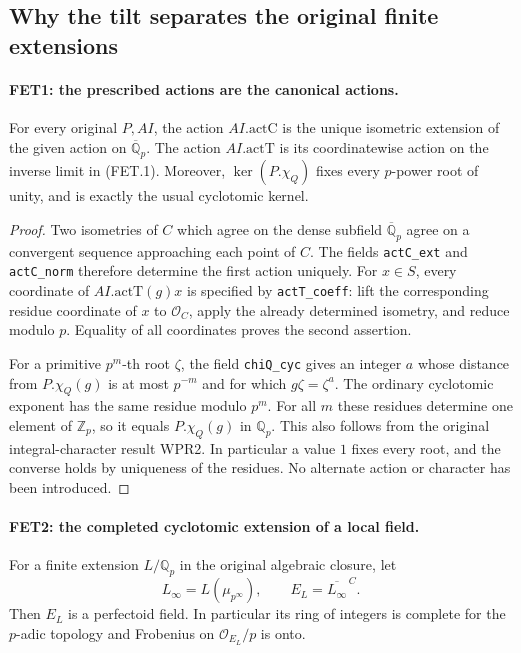 \subsection{Why the tilt separates the original finite extensions}

\paragraph{FET1: the prescribed actions are the canonical actions.}
\label{claim:FET1}
For every original $P,AI$, the action $AI.\mathrm{actC}$ is the
unique isometric extension of the given action on
$\overline{\mathbb Q}_p$. The action $AI.\mathrm{actT}$ is its
coordinatewise action on the inverse limit in (FET.1). Moreover,
$\ker(P.\chi_Q)$ fixes every $p$-power root of unity, and is exactly
the usual cyclotomic kernel.

\begin{proof}
Two isometries of $C$ which agree on the dense subfield
$\overline{\mathbb Q}_p$ agree on a convergent sequence approaching
each point of $C$. The fields \texttt{actC\_ext} and
\texttt{actC\_norm} therefore determine the first action uniquely.
For $x\in S$, every coordinate of $AI.\mathrm{actT}(g)x$ is
specified by \texttt{actT\_coeff}: lift the corresponding residue
coordinate of $x$ to $\mathcal O_C$, apply the already determined
isometry, and reduce modulo $p$. Equality of all coordinates proves
the second assertion.

For a primitive $p^m$-th root $\zeta$, the field
\texttt{chiQ\_cyc} gives an integer $a$ whose distance from
$P.\chi_Q(g)$ is at most $p^{-m}$ and for which $g\zeta=\zeta^a$.
The ordinary cyclotomic exponent has the same residue modulo $p^m$.
For all $m$ these residues determine one element of $\mathbb Z_p$,
so it equals $P.\chi_Q(g)$ in $\mathbb Q_p$.
This also follows from the original integral-character result WPR2.
In particular a value $1$ fixes every root, and the converse holds by
uniqueness of the residues. No alternate action or character has been
introduced.
\end{proof}

\paragraph{FET2: the completed cyclotomic extension of a local field.}
\label{claim:FET2}
For a finite extension $L/\mathbb Q_p$ in the original algebraic
closure, let
\[
 L_\infty=L(\mu_{p^\infty}),\qquad
 E_L=\overline{L_\infty}^{\,C}.
\]
Then $E_L$ is a perfectoid field. In particular its ring of integers
is complete for the $p$-adic topology and Frobenius on
$\mathcal O_{E_L}/p$ is onto.


